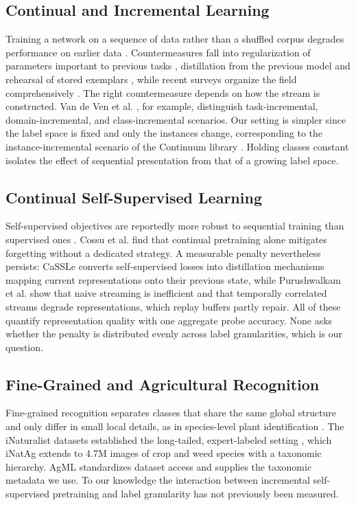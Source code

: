 \documentclass[english]{lni}
\begin{document}
\subsection{Continual and Incremental Learning}

Training a network on a sequence of data rather than a shuffled corpus degrades performance on earlier data \cite{French1999}. Countermeasures fall into regularization of parameters important to previous tasks \cite{Kirkpatrick2017}, distillation from the previous model \cite{Li2018} and rehearsal of stored exemplars \cite{Rebuffi2017}, while recent surveys organize the field comprehensively \cite{Parisi2019}. The right countermeasure depends on how the stream is constructed. Van de Ven et al. \cite{VanDeVen2019}, for example, distinguish task-incremental, domain-incremental, and class-incremental scenarios. Our setting is simpler since the label space is fixed and only the instances change, corresponding to the instance-incremental scenario of the Continuum library \cite{Douillard2021}. Holding classes constant isolates the effect of sequential presentation from that of a growing label space.

\subsection{Continual Self-Supervised Learning}

Self-supervised objectives are reportedly more robust to sequential training than supervised ones \cite{Madaan2022}. Cossu et al. \cite{Cossu2024} find that continual pretraining alone mitigates forgetting without a dedicated strategy. A measurable penalty nevertheless persists: CaSSLe \cite{Fini2022} converts self-supervised losses into distillation mechanisms mapping current representations onto their previous state, while Purushwalkam et al. \cite{Purushwalkam2022} show that naive streaming is inefficient and that temporally correlated streams degrade representations, which replay buffers partly repair. All of these quantify representation quality with one aggregate probe accuracy. None asks whether the penalty is distributed evenly across label granularities, which is our question.

\subsection{Fine-Grained and Agricultural Recognition}

Fine-grained recognition separates classes that share the same global structure and only differ in small local details, as in species-level plant identification \cite{Wei2022}. The iNaturalist datasets established the long-tailed, expert-labeled setting \cite{VanHorn2018}, which iNatAg \cite{Jain2025} extends to 4.7M images of crop and weed species with a taxonomic hierarchy. AgML \cite{Joshi2023} standardizes dataset access and supplies the taxonomic metadata we use. To our knowledge the interaction between incremental self-supervised pretraining and label granularity has not previously been measured.
\end{document}
